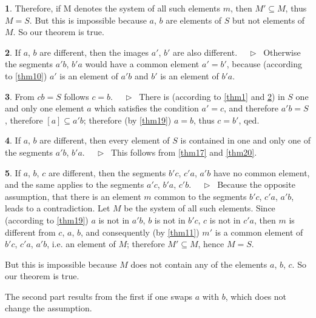 \documentclass[leqno,hidelinks]{article}
\theoremstyle{definition}
\newtheorem{satz}{\protect\satzname}
\newcommand{\satzname}{}
\renewcommand{\satzname}{\hspace{-4pt}.\ Satz}%
\renewcommand{\satzname}{\hspace{-4pt}.\ Theorem}%
\newcommand\Beweis{\medskip \newline $ \phantom{'.'} \rhd \ $}%
\newcommand{\partof}{\subseteq}
\newcommand{\sref}[1]{\underline{\ref{#1}}}%
\begin{document}
\begin{paracol}{2}
\begin{satz}
Therefore, if M denotes the system of all such elements $m$, then $M' \partof M$,
thus $M=S$. But this is impossible because $a$, $b$ are elements of $S$ but not
elements of $M$. So our theorem is true.%
\ \\
\end{satz}

\begin{satz}\label{thm21}
If $a$, $b$ are different, then the images $a'$, $b'$ are also different.
\Beweis
Otherwise the segments $a'b$, $b'a$ would have a common element $a'=b'$, because
(according to \sref{thm10}) $a'$ is an element of $a'b$ and $b'$ is an element
of $b'a$.%
\end{satz}

\begin{satz}\label{thm22}
From $cb=S$ follows $c = b$.
\Beweis
There is (according to \sref{thm1} and \sref{thm21}) in $S$ one and only one element
$a$ which satisfies the condition $a'=c$, and therefore $a'b = S$, therefore
$[a] \partof a'b$; therefore (by \sref{thm19}) $a=b$, thus $c=b'$, qed.%
\end{satz}

\begin{satz}\label{thm23}
If $a$, $b$ are different, then every element of $S$ is contained in one and only
one of the segments $a'b$, $b'a$.
\Beweis
This follows from \sref{thm17} and \sref{thm20}.
\end{satz}

\begin{satz}\label{thm24}
If $a$, $b$, $c$ are different, then the segments $b'c$, $c'a$, $a'b$ have no
common element, and the same applies to the segments $a'c$, $b'a$, $c'b$.
\Beweis
Because the opposite assumption, that there is an element $m$ common to the segments
$b'c$, $c'a$, $a'b$, leads to a contradiction. Let $M$ be the system of all such
elements. Since (according to \sref{thm19}) $a$ is not in $a'b$, $b$ is not in $b'c$,
$c$ is not in $c'a$, then $m$ is different from $c$, $a$, $b$, and consequently
(by \sref{thm11}) $m'$ is a common element of $b'c$, $c'a$, $a'b$, i.e. an element
of $M$; therefore $M' \partof M$, hence  $M=S$.

But this is impossible because $M$ does not contain any of the elements $a$, $b$,
$c$. So our theorem is true.

The second part results from the first if one swaps $a$ with $b$, which does not
change the assumption.
\end{satz}


\end{paracol}
\end{document}
